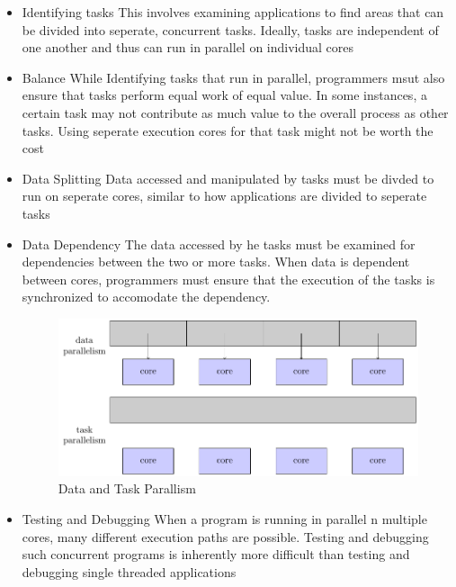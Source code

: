 \documentclass{book/custombook}
\begin{document}
            \begin{itemize}
                \item Identifying tasks
                    \subitem This involves examining applications to find areas that can be divided into seperate, concurrent tasks. Ideally, tasks
                    are independent of one another and thus can run in parallel on individual cores
                \item Balance
                    \subitem While Identifying tasks that run in parallel, programmers msut also ensure that tasks perform equal work of equal value.
                    In some instances, a certain task may not contribute as much value to the overall process as other tasks. Using seperate execution cores
                    for that task might not be worth the cost
                \item Data Splitting
                    \subitem Data accessed and manipulated by tasks must be divded to run on seperate cores, similar to how applications are divided to seperate tasks
                \item Data Dependency
                    \subitem The data accessed by he tasks must be examined for dependencies between the two or more tasks. When data is dependent between cores,
                    programmers must ensure that the execution of the tasks is synchronized to accomodate the dependency.
                    \begin{figure}[H]
                        \centering
                        \includegraphics{figures/data_task_parallelism.pdf}
                        \caption{Data and Task Parallism}
                    \end{figure}
                \item Testing and Debugging
                    \subitem When a program is running in parallel n multiple cores, many different execution paths are possible. Testing and debugging such
                    concurrent programs is inherently more difficult than testing and debugging single threaded applications
            \end{itemize}
\end{document}
